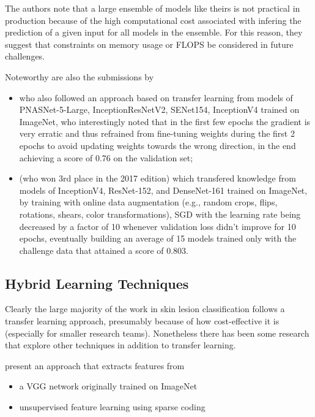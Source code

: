The authors note that a large ensemble of models like theirs is not practical in production because of the high computational cost associated with infering the prediction of a given input for all models in the ensemble. For this reason, they suggest that constraints on memory usage or \ac{FLOPS} be considered in future challenges.

Noteworthy are also the submissions by

\begin{itemize}
    \item \citeauthor{isic2018milton} \cite{isic2018milton} who also followed an approach based on transfer learning from models of PNASNet-5-Large, InceptionResNetV2, SENet154, InceptionV4 trained on ImageNet, who interestingly noted that in the first few epochs the gradient is very erratic and thus refrained from fine-tuning weights during the first 2 epochs to avoid updating weights towards the wrong direction, in the end achieving a score of 0.76 on the validation set;
    \item \citeauthor{isic2018bissoto} \cite{isic2018bissoto} (who won 3rd place in the 2017 edition) which transfered knowledge from models of InceptionV4, ResNet-152, and DenseNet-161 trained on ImageNet, by training with online data augmentation (e.g., random crops, flips, rotations, shears, color transformations), \ac{SGD} with the learning rate being decreased by a factor of 10 whenever validation loss didn't improve for 10 epochs, eventually building an average of 15 models trained only with the challenge data that attained a score of 0.803.
\end{itemize}

\subsection{Hybrid Learning Techniques}

Clearly the large majority of the work in skin lesion classification follows a transfer learning approach, presumably because of how cost-effective it is (especially for smaller research teams). Nonetheless there has been some research that explore other techniques in addition to transfer learning.

\citeauthor{hybrid2} \cite{hybrid2} present an approach that extracts features from

\begin{itemize}
    \item a \ac{VGG} network originally trained on ImageNet
    \item unsupervised feature learning using sparse coding
\end{itemize}

